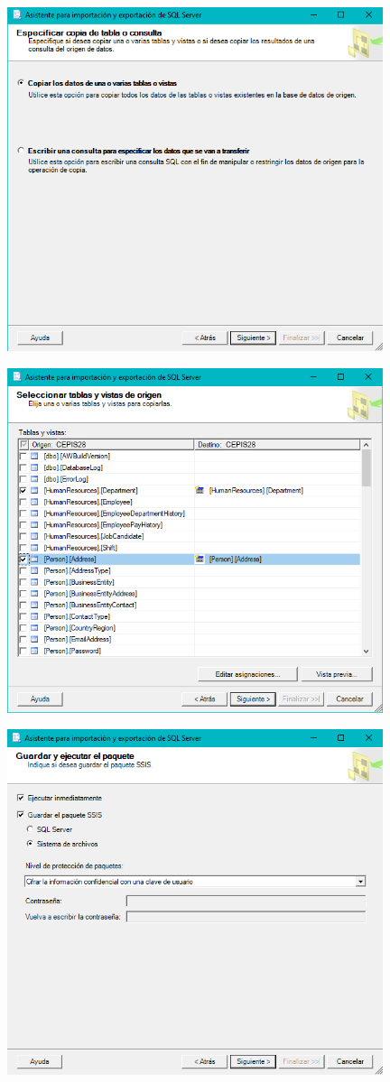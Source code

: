 	\begin{center}
	\includegraphics[width=11cm]{./Imagenes/img6}
	\end{center}	
	\begin{center}
	\includegraphics[width=11cm]{./Imagenes/img7}
	\end{center}	
	\begin{center}
	\includegraphics[width=11cm]{./Imagenes/img8}
	\end{center}	
